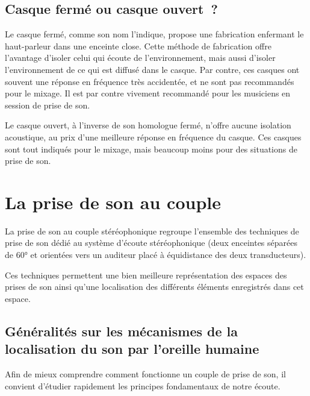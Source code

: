 \documentclass[
]{book}
\begin{document}
\hypertarget{casque-fermuxe9-ou-casque-ouvert}{%
\section{Casque fermé ou casque ouvert~?}\label{casque-fermuxe9-ou-casque-ouvert}}

Le casque fermé, comme son nom l'indique, propose une fabrication enfermant le haut-parleur dans une enceinte close. Cette méthode de fabrication offre l'avantage d'isoler celui qui écoute de l'environnement, mais aussi d'isoler l'environnement de ce qui est diffusé dans le casque. Par contre, ces casques ont souvent une réponse en fréquence très accidentée, et ne sont pas recommandés pour le mixage. Il est par contre vivement recommandé pour les musiciens en session de prise de son.

Le casque ouvert, à l'inverse de son homologue fermé, n'offre aucune isolation acoustique, au prix d'une meilleure réponse en fréquence du casque. Ces casques sont tout indiqués pour le mixage, mais beaucoup moins pour des situations de prise de son.

\hypertarget{la-prise-de-son-au-couple}{%
\chapter{La prise de son au couple}\label{la-prise-de-son-au-couple}}

La prise de son au couple stéréophonique regroupe l'ensemble des techniques de prise de son dédié au système d'écoute stéréophonique (deux enceintes séparées de 60° et orientées vers un auditeur placé à équidistance des deux transducteurs).

Ces techniques permettent une bien meilleure représentation des espaces des prises de son ainsi qu'une localisation des différents éléments enregistrés dans cet espace.

\hypertarget{guxe9nuxe9ralituxe9s-sur-les-muxe9canismes-de-la-localisation-du-son-par-loreille-humaine}{%
\section{Généralités sur les mécanismes de la localisation du son par l'oreille humaine}\label{guxe9nuxe9ralituxe9s-sur-les-muxe9canismes-de-la-localisation-du-son-par-loreille-humaine}}

Afin de mieux comprendre comment fonctionne un couple de prise de son, il convient d'étudier rapidement les principes fondamentaux de notre écoute.
\end{document}
